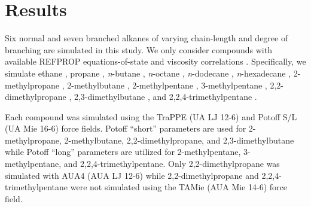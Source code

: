 \documentclass[preprint,review,12pt]{elsarticle}
\begin{document}
	  
	
%	
%	
%	
%	
%	
%	
%	
%	
	
	\section{Results} \label{Results}
	
	Six normal and seven branched alkanes of varying chain-length and degree of branching are simulated in this study. We only consider compounds with available REFPROP equations-of-state and viscosity correlations \cite{LEMMON-RP91}. Specifically, we simulate ethane \cite{Ethane2006,Vogel2015}, propane \cite{Propane2009,Vogel2016}, \textit{n}-butane \cite{Butane2006,Hermann2018}, \textit{n}-octane \cite{Beckmueller2017,Huber2004FPE}, \textit{n}-dodecane \cite{Lemmon2004,Huber2004}, \textit{n}-hexadecane \cite{Romeo2018,Vesovic2017}, 2-methylpropane \cite{Lemmon2006,Vogel2000}, 2-methylbutane \cite{Lemmon2006,Huber2018}, 2-methylpentane \cite{Lemmon2006,Huber2018}, 3-methylpentane \cite{Gao2017,Huber2018}, 2,2-dimethylpropane \cite{Lemmon2006,Huber2018}, 2,3-dimethylbutane \cite{Gao2017,Huber2018}, and 2,2,4-trimethylpentane \cite{Blackham2017,Huber2018}. 
	
	Each compound was simulated using the TraPPE (UA LJ 12-6) and Potoff S/L (UA Mie 16-6) force fields. Potoff ``short'' parameters are used for 2-methylpropane, 2-methylbutane, 2,2-dimethylpropane, and 2,3-dimethylbutane while Potoff ``long'' parameters are utilized for 2-methylpentane, 3-methylpentane, and 2,2,4-trimethylpentane. Only 2,2-dimethylpropane was simulated with AUA4 (AUA LJ 12-6) while 2,2-dimethylpropane and 2,2,4-trimethylpentane were not simulated using the TAMie (AUA Mie 14-6) force field.
	
\end{document}
